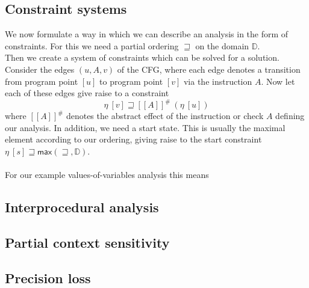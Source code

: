     \subsection{Constraint systems}
    We now formulate a way in which we can describe an analysis in the form of constraints. For this we need a partial ordering $\sqsupseteq$ on the domain $\mathbb{D}$.\\
    Then we create a system of constraints which can be solved for a solution. Consider the edges $(u, A, v)$ of the CFG, where each edge denotes a transition from program point $[u]$ to program point $[v]$ via the instruction $A$. Now let each of these edges give raise to a constraint
    \[\eta\ [v] \sqsupseteq [\![A]\!]^{\#}\ (\eta\ [u])\]
    where $[\![A]\!]^{\#}$ denotes the abstract effect of the instruction or check $A$ defining our analysis. In addition, we need a start state. This is usually the maximal element according to our ordering, giving raise to the start constraint $\eta\ [s] \sqsupseteq \textsf{max}(\sqsupseteq,\mathbb{D})$.\\
    \\
    For our example values-of-variables analysis this means 

    \subsection{Interprocedural analysis}

    \subsection{Partial context sensitivity}

    \subsection{Precision loss}
    
  



